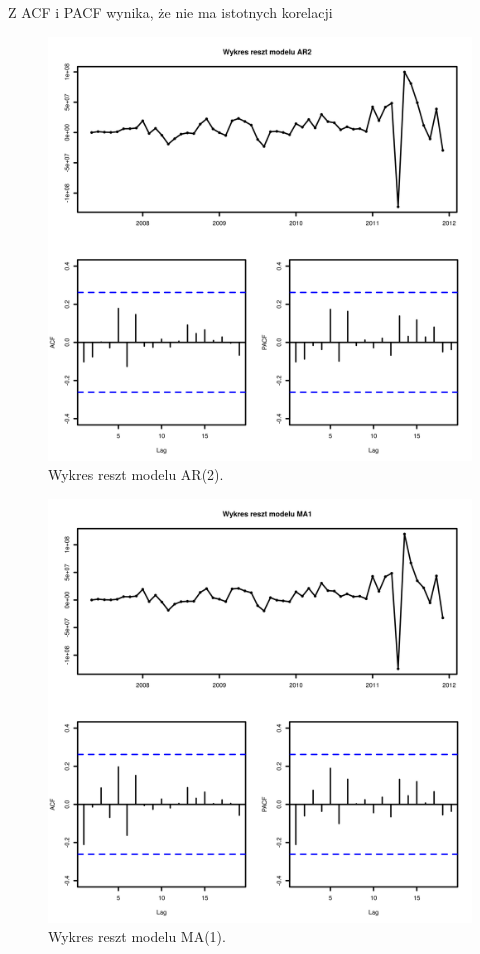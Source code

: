 \documentclass[11pt]{article}
\begin{document}
Z ACF i PACF wynika, że nie ma istotnych korelacji

\newpage

\begin{figure}[h]
    \centering
	\includegraphics[width=\textwidth]{images/train_monthly_train_AR2_reszty.png}
    \caption{Wykres reszt modelu AR(2).}
    \label{fig:train_monthly_train_AR2_reszty}

\end{figure}

\newpage

\begin{figure}[h]
    \centering
	\includegraphics[width=\textwidth]{images/train_monthly_train_MA1_reszty.png}
    \caption{Wykres reszt modelu MA(1).}
    \label{fig:train_monthly_train_MA1_reszty}

\end{figure}
\end{document}
